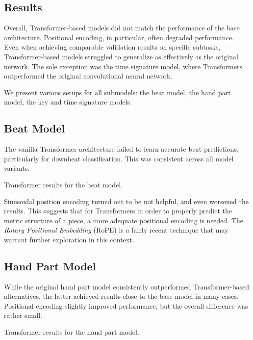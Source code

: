 \subsection{Results}

Overall, Transformer-based models did not match the performance of the base architecture. Positional encoding, in particular, often degraded performance. Even when achieving comparable validation results on specific subtasks, Transformer-based models struggled to generalize as effectively as the original network. The sole exception was the time signature model, where Transformers outperformed the original convolutional neural network.

We present various setups for all submodels: the beat model, the hand part model, the key and time signature models.

\subsection{Beat Model}

The vanilla Transformer architecture failed to learn accurate beat predictions, particularly for downbeat classification. This was consistent across all model variants.

\begin{table}[ht!]
\centering

\caption[Transformer results for the beat model.]{Transformer results for the beat model.}
\label{beat_transformer}
\end{table}

Sinusoidal position encoding turned out to be not helpful, and even worsened the results. This suggests that for Transformers in order to properly predict the metric structure of a piece, a more adequate positional encoding is needed. The \emph{Rotary Positional Embedding} (RoPE) \cite{Su2024} is a fairly recent technique that may warrant further exploration in this context.

\subsection{Hand Part Model}

While the original hand part model consistently outperformed Transformer-based alternatives, the latter achieved results close to the base model in many cases. Positional encoding slightly improved performance, but the overall difference was rather small.

\begin{table}[ht!]
\centering

\caption[Transformer results for the hand part model.]{Transformer results for the hand part model.}
\label{hand_part_transformer}
\end{table}

